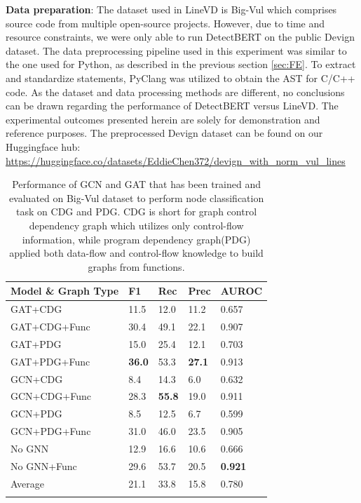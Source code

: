 \documentclass{ieeeaccess}
\begin{document}
\par \textbf{Data preparation}: The dataset used in LineVD is Big-Vul which comprises source code from multiple open-source projects. However, due to time and resource constraints, we were only able to run DetectBERT on the public Devign dataset\cite{devign}. The data preprocessing pipeline used in this experiment was similar to the one used for Python, as described in the previous section \ref{sec:FE}. To extract and standardize statements, PyClang was utilized to obtain the AST for C/C++ code. As the dataset and data processing methods are different, no conclusions can be drawn regarding the performance of DetectBERT versus LineVD. The experimental outcomes presented herein are solely for demonstration and reference purposes. The preprocessed Devign dataset can be found on our Huggingface hub: \url{https://huggingface.co/datasets/EddieChen372/devign_with_norm_vul_lines}

  
\begin{table}[h]
\centering

\begin{tabular}{lllll}
\Xhline{2\arrayrulewidth}
\textbf{Model} \& \textbf{Graph Type} & \textbf{F1} & \textbf{R}ec & \textbf{Prec} & \textbf{AUROC} \\
 \hline
\rowcolor{gray!15} 
GAT+CDG & 11.5 & 12.0 & 11.2 & 0.657 \\
GAT+CDG+Func & 30.4 & 49.1 & 22.1 & 0.907\\
\rowcolor{gray!15} 
GAT+PDG & 15.0 & 25.4 & 12.1 & 0.703 \\
GAT+PDG+Func & \textbf{36.0} & 53.3 & \textbf{27.1} & 0.913\\
\rowcolor{gray!15} 
GCN+CDG & 8.4 & 14.3 & 6.0 & 0.632 \\
GCN+CDG+Func & 28.3 & \textbf{55.8} & 19.0 & 0.911 \\
\rowcolor{gray!15} 
GCN+PDG & 8.5 & 12.5 & 6.7 & 0.599 \\
GCN+PDG+Func & 31.0 & 46.0 & 23.5 & 0.905\\
\rowcolor{gray!15} 
No GNN & 12.9 & 16.6 & 10.6 & 0.666 \\
No GNN+Func & 29.6 & 53.7 & 20.5 & \textbf{0.921} \\
\hline
\rowcolor{gray!15} 
Average & 21.1 & 33.8 & 15.8 & 0.780 \\
\Xhline{2\arrayrulewidth}
\end{tabular}
\caption{Performance of GCN and GAT that has been trained and evaluated on Big-Vul dataset to perform node classification task on CDG and PDG. CDG is short for graph control dependency graph which utilizes only control-flow information, while program dependency graph(PDG) applied both data-flow and control-flow knowledge to build graphs from functions.\cite{Linevd}}
\label{table:RQ5_2}
\end{table}
\end{document}
